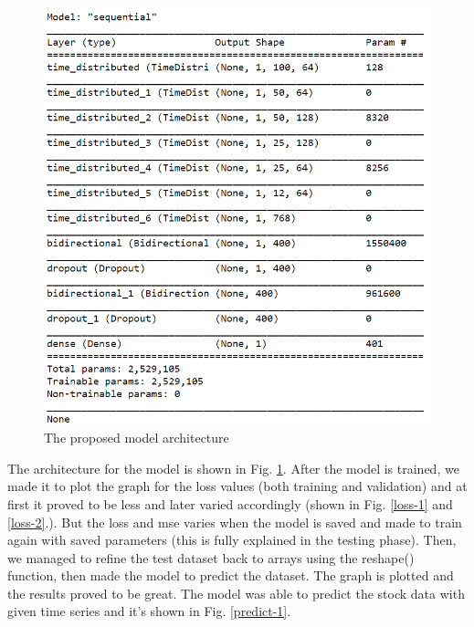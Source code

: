 \documentclass[conference]{IEEEtran}
\begin{document}
\begin{figure}[htbp]
\centerline{\includegraphics[scale=0.5]{model_arch-1.png}}
\caption{The proposed model architecture}
\label{model}
\end{figure}

The architecture for the model is shown in Fig. \ref{model}. After the model is trained, we made it to plot the graph for the loss values (both training and validation) and at first it proved to be less and later varied accordingly (shown in Fig. \ref{loss-1} and \ref{loss-2}.). But the loss and mse varies when the model is saved and made to train again with saved parameters (this is fully explained in the testing phase). Then, we managed to refine the test dataset back to arrays using the reshape() function, then made the model to predict the dataset. The graph is plotted and the results proved to be great. The model was able to predict the stock data with given time series and it's shown in Fig. \ref{predict-1}. 
\end{document}
